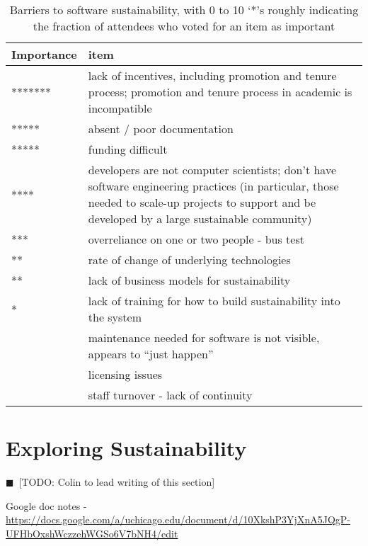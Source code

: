 \documentclass[11pt, oneside]{amsart}
\newcommand{\todo}[1]{{\color{blue}$\blacksquare$~\textsf{[TODO: #1]}}}
\begin{document}
\begin{table*}[ht]
\begin{center}
    \caption{Barriers to software sustainability, with 0 to 10 `*'s roughly indicating the fraction of attendees who voted for an item as important}
    \begin{scriptsize}
    \begin{tabular}{ | p{1.65cm} | p{10.0cm} |}
    \hline
  Importance & item \\ \hline \hline
******* & lack of incentives, including promotion and tenure process; promotion and tenure process in academic is incompatible \\ \hline
*****  & absent / poor documentation \\ \hline
***** & funding difficult \\ \hline
**** & developers are not computer scientists; don't have software engineering practices (in particular, those needed to scale-up projects to support and be developed by a large sustainable community) \\ \hline
*** & overreliance on one or two people - bus test \\ \hline
** & rate of change of underlying technologies \\ \hline
** & lack of business models for sustainability \\ \hline
* & lack of training for how to build sustainability into the system \\ \hline
 & maintenance needed for software is not visible, appears to ``just happen'' \\ \hline
 & licensing issues \\ \hline
 & staff turnover - lack of continuity \\ \hline
    \end{tabular}
    \end{scriptsize}
    \label{tb:software_sustainability_barriers}
\end{center}   
\end{table*} 


\section{Exploring Sustainability}

\todo{Colin to lead writing of this section}

Google doc notes - \url{https://docs.google.com/a/uchicago.edu/document/d/10XkshP3YjXnA5JQgP-UFHbOxshWczzehWGSo6V7bNH4/edit}
\end{document}

